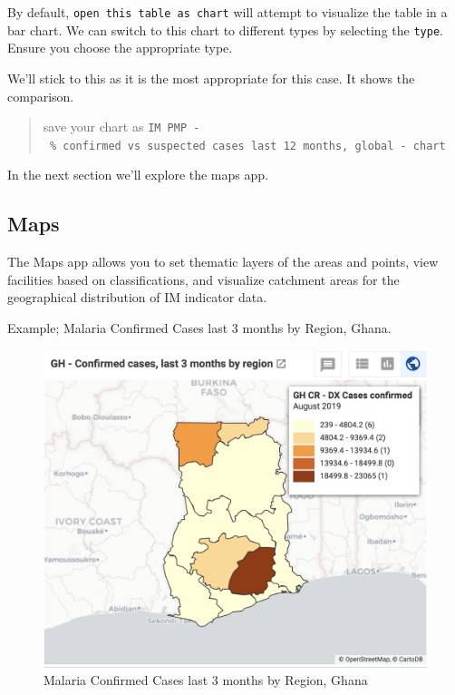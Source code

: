 \documentclass[]{book}
\begin{document}
By default, \texttt{open\ this\ table\ as\ chart} will attempt to visualize the table in a bar chart. We can switch to this chart to different types by selecting the \texttt{type}. Ensure you choose the appropriate type.

We'll stick to this as it is the most appropriate for this case. It shows the comparison.

\begin{quote}
save your chart as \texttt{IM\ PMP\ -\ \%\ confirmed\ vs\ suspected\ cases\ last\ 12\ months,\ global\ -\ chart}
\end{quote}

In the next section we'll explore the maps app.

\hypertarget{map}{%
\subsection{Maps}\label{map}}

The Maps app allows you to set thematic layers of the areas and points, view facilities based on classifications, and visualize catchment areas for the geographical distribution of IM indicator data.

Example; Malaria Confirmed Cases last 3 months by Region, Ghana.

\begin{figure}
\includegraphics[width=15.06in]{./images/maps2} \caption{Malaria Confirmed Cases last 3 months by Region, Ghana}\label{fig:maps2}
\end{figure}
\end{document}
